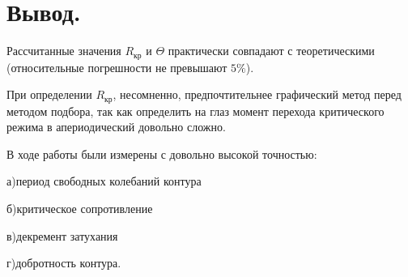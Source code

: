 \documentclass[a4paper, 12pt, twoside]{article}
\begin{document}
\section{Вывод.}

Рассчитанные значения $R_{\text{кр}}$ и $\Theta$ практически совпадают с теоретическими (относительные погрешности не превышают $5\%$).

При определении $R_{\text{кр}}$, несомненно, предпочтительнее графический метод перед методом подбора, так как определить на глаз момент перехода критического режима в апериодический довольно сложно.

В ходе работы были измерены с довольно высокой точностью:

а)период свободных колебаний контура

б)критическое сопротивление

в)декремент затухания

г)добротность контура.
\end{document}
